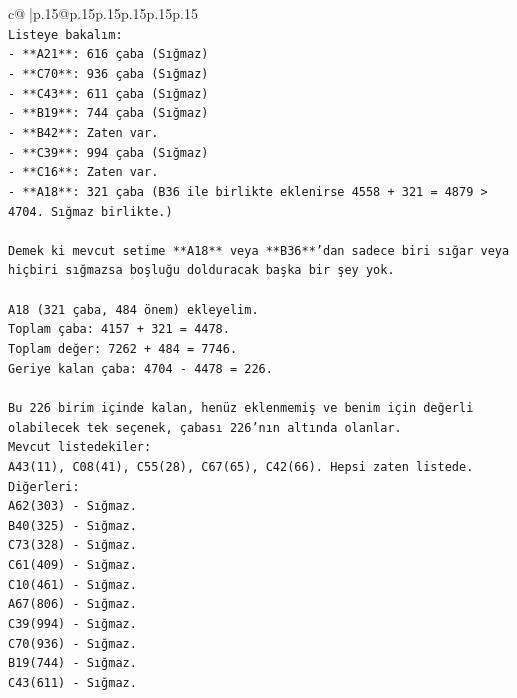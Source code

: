 \documentclass{article}
\begin{document}
{\begin{supertabular}{c@{$\;$}|p{.15\linewidth}@{}p{.15\linewidth}p{.15\linewidth}p{.15\linewidth}p{.15\linewidth}p{.15\linewidth}}
{{{\\ 
\texttt{Listeye bakalım:} \\
\texttt{{-} **A21**: 616 çaba (Sığmaz)} \\
\texttt{{-} **C70**: 936 çaba (Sığmaz)} \\
\texttt{{-} **C43**: 611 çaba (Sığmaz)} \\
\texttt{{-} **B19**: 744 çaba (Sığmaz)} \\
\texttt{{-} **B42**: Zaten var.} \\
\texttt{{-} **C39**: 994 çaba (Sığmaz)} \\
\texttt{{-} **C16**: Zaten var.} \\
\texttt{{-} **A18**: 321 çaba (B36 ile birlikte eklenirse 4558 + 321 = 4879 > 4704. Sığmaz birlikte.)} \\
\\ 
\texttt{Demek ki mevcut setime **A18** veya **B36**'dan sadece biri sığar veya hiçbiri sığmazsa boşluğu dolduracak başka bir şey yok.} \\
\\ 
\texttt{A18 (321 çaba, 484 önem) ekleyelim.} \\
\texttt{Toplam çaba: 4157 + 321 = 4478.} \\
\texttt{Toplam değer: 7262 + 484 = 7746.} \\
\texttt{Geriye kalan çaba: 4704 {-} 4478 = 226.} \\
\\ 
\texttt{Bu 226 birim içinde kalan, henüz eklenmemiş ve benim için değerli olabilecek tek seçenek, çabası 226'nın altında olanlar.} \\
\texttt{Mevcut listedekiler:} \\
\texttt{A43(11), C08(41), C55(28), C67(65), C42(66). Hepsi zaten listede.} \\
\texttt{Diğerleri:} \\
\texttt{A62(303) {-} Sığmaz.} \\
\texttt{B40(325) {-} Sığmaz.} \\
\texttt{C73(328) {-} Sığmaz.} \\
\texttt{C61(409) {-} Sığmaz.} \\
\texttt{C10(461) {-} Sığmaz.} \\
\texttt{A67(806) {-} Sığmaz.} \\
\texttt{C39(994) {-} Sığmaz.} \\
\texttt{C70(936) {-} Sığmaz.} \\
\texttt{B19(744) {-} Sığmaz.} \\
\texttt{C43(611) {-} Sığmaz.} \\
}}}
\end{supertabular}}
\end{document}
